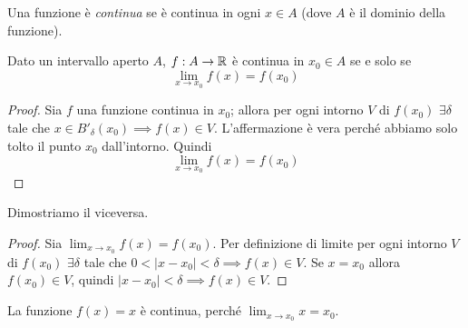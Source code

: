 \begin{definition}
Una funzione è \emph{continua} se è continua in ogni $x \in A$ (dove $A$ è il dominio della funzione).
\end{definition}

\begin{proposition}
Dato un intervallo aperto $A$, $f: A \to \mathbb R$ è continua in $x_0 \in A$ se e solo se
\begin{equation*}
\lim_{x \to x_0} f(x) = f(x_0)
\end{equation*}
\end{proposition}

\begin{proof}
Sia $f$ una funzione continua in $x_0$; allora per ogni intorno $V$ di $f(x_0)$ $\exists \delta$ tale che $x \in B'_\delta (x_0) \implies f(x) \in V$. L'affermazione è vera perché abbiamo solo tolto il punto $x_0$ dall'intorno. Quindi
\begin{equation*}
\lim_{x \to x_0} f(x) = f(x_0)
\end{equation*}
\end{proof}

Dimostriamo il viceversa.
\begin{proof}
Sia $\lim_{x \to x_0} f(x) = f(x_0)$. Per definizione di limite per ogni intorno $V$ di $f(x_0)$ $\exists \delta$ tale che $0 < |x - x_0| < \delta \implies f(x) \in V$. Se $x = x_0$ allora $f(x_0) \in V$, quindi $|x-x_0| < \delta \implies f(x) \in V$.
\end{proof}

\begin{example}
La funzione $f(x) = x$ è continua, perché $\lim_{x \to x_0} x = x_0$.
\end{example}


